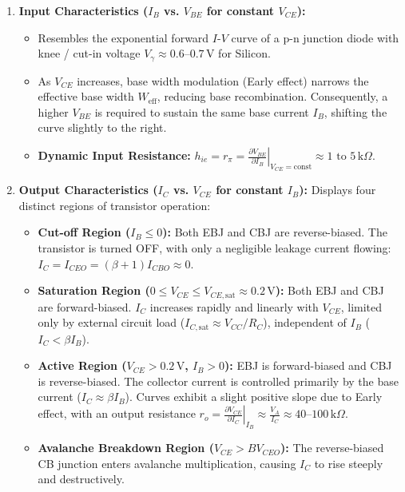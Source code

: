 \documentclass[12pt,a4paper]{article}
\begin{document}
\begin{enumerate}[label=\arabic*., leftmargin=*]
  \item \textbf{Input Characteristics ($I_B$ vs. $V_{BE}$ for constant $V_{CE}$):}
  \begin{itemize}
    \item Resembles the exponential forward $I\text{-}V$ curve of a p-n junction diode with knee / cut-in voltage $V_\gamma \approx 0.6\text{--}0.7\,\text{V}$ for Silicon.
    \item As $V_{CE}$ increases, base width modulation (Early effect) narrows the effective base width $W_{\text{eff}}$, reducing base recombination. Consequently, a higher $V_{BE}$ is required to sustain the same base current $I_B$, shifting the curve slightly to the right.
    \item \textbf{Dynamic Input Resistance:} $h_{ie} = r_\pi = \left.\frac{\partial V_{BE}}{\partial I_B}\right|_{V_{CE} = \text{const}} \approx 1\text{ to } 5\,\text{k}\Omega$.
  \end{itemize}
  \item \textbf{Output Characteristics ($I_C$ vs. $V_{CE}$ for constant $I_B$):}
  Displays four distinct regions of transistor operation:
  \begin{itemize}
    \item \textbf{Cut-off Region ($I_B \le 0$):} Both EBJ and CBJ are reverse-biased. The transistor is turned OFF, with only a negligible leakage current flowing: $I_C = I_{CEO} = (\beta + 1)I_{CBO} \approx 0$.
    \item \textbf{Saturation Region ($0 \le V_{CE} \le V_{CE,\text{sat}} \approx 0.2\,\text{V}$):} Both EBJ and CBJ are forward-biased. $I_C$ increases rapidly and linearly with $V_{CE}$, limited only by external circuit load ($I_{C,\text{sat}} \approx V_{CC}/R_C$), independent of $I_B$ ($I_C < \beta I_B$).
    \item \textbf{Active Region ($V_{CE} > 0.2\,\text{V}$, $I_B > 0$):} EBJ is forward-biased and CBJ is reverse-biased. The collector current is controlled primarily by the base current ($I_C \approx \beta I_B$). Curves exhibit a slight positive slope due to Early effect, with an output resistance $r_o = \left.\frac{\partial V_{CE}}{\partial I_C}\right|_{I_B} \approx \frac{V_A}{I_C} \approx 40\text{--}100\,\text{k}\Omega$.
    \item \textbf{Avalanche Breakdown Region ($V_{CE} > BV_{CEO}$):} The reverse-biased CB junction enters avalanche multiplication, causing $I_C$ to rise steeply and destructively.
  \end{itemize}
\end{enumerate}
\end{document}
